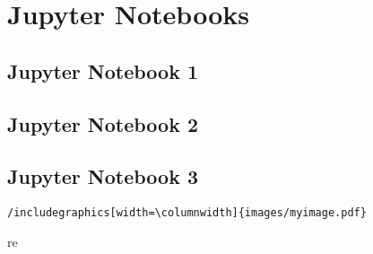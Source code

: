 \section{Jupyter Notebooks}

\subsection{Jupyter Notebook 1}

\subsection{Jupyter Notebook 2}

\subsection{Jupyter Notebook 3}

 \begin{verbatim}/includegraphics[width=\columnwidth]{images/myimage.pdf}\end{verbatim}

re
